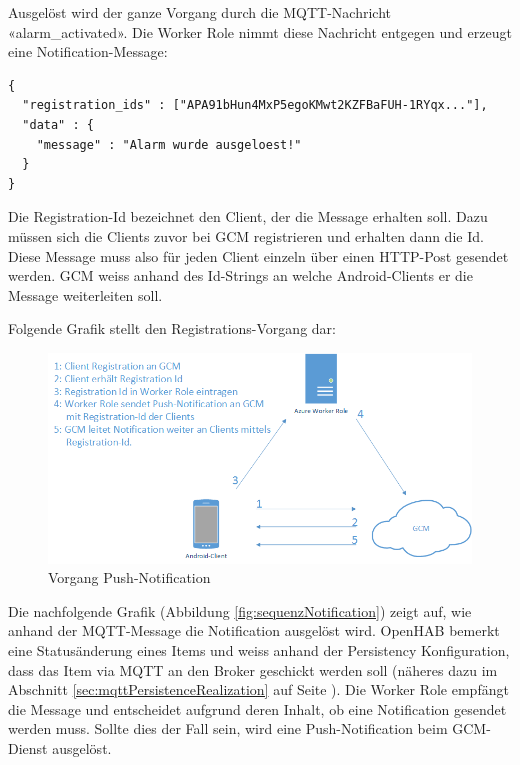 Ausgelöst wird der ganze Vorgang durch die MQTT-Nachricht «alarm\_activated». Die Worker Role nimmt diese Nachricht entgegen und erzeugt eine Notification-Message:

\begin{lstlisting}[style=csharp, caption=Notification.cs - Notification Message]
{
  "registration_ids" : ["APA91bHun4MxP5egoKMwt2KZFBaFUH-1RYqx..."],
  "data" : {
  	"message" : "Alarm wurde ausgeloest!"
  }
}
\end{lstlisting}

Die Registration-Id bezeichnet den Client, der die Message erhalten soll. Dazu müssen sich die Clients zuvor bei GCM registrieren und erhalten dann die Id. Diese Message muss also für jeden Client einzeln über einen HTTP-Post gesendet werden. GCM weiss anhand des Id-Strings an welche Android-Clients er die Message weiterleiten soll.

Folgende Grafik stellt den Registrations-Vorgang dar:
\begin{figure}[H]
	\centering
		\includegraphics[scale=0.7]{report/img/gcm}
	\caption{Vorgang Push-Notification}
	\label{fig:notification}
\end{figure}

Die nachfolgende Grafik (Abbildung \ref{fig:sequenzNotification}) zeigt auf, wie anhand der MQTT-Message die Notification ausgelöst wird. OpenHAB bemerkt eine Statusänderung eines Items und weiss anhand der Persistency Konfiguration, dass das Item via MQTT an den Broker geschickt werden soll (näheres dazu im Abschnitt \ref{sec:mqttPersistenceRealization} auf Seite \pageref{sec:mqttPersistenceRealization}). Die Worker Role empfängt die Message und entscheidet aufgrund deren Inhalt, ob eine Notification gesendet werden muss. Sollte dies der Fall sein, wird eine Push-Notification beim GCM-Dienst ausgelöst.

